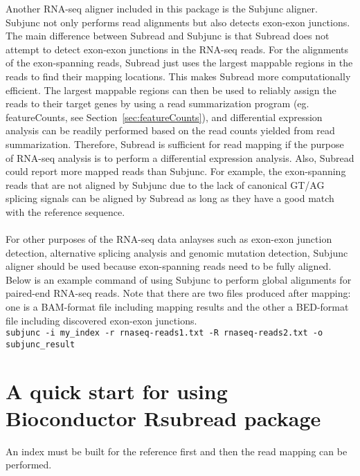 \documentclass[12pt]{report}
\newcommand{\code}[1]{{\small\texttt{#1}}}
\newcommand{\Subread}{\textsf{Subread}}
\newcommand{\Subjunc}{\textsf{Subjunc}}
\newcommand{\Rsubread}{\textsf{Rsubread}}
\newcommand{\featureCounts}{\textsf{featureCounts}}
\begin{document}
\noindent Another RNA-seq aligner included in this package is the {\Subjunc} aligner.
{\Subjunc} not only performs read alignments but also detects exon-exon junctions.
The main difference between {\Subread} and {\Subjunc} is that {\Subread} does not attempt to detect exon-exon junctions in the RNA-seq reads.
For the alignments of the exon-spanning reads, {\Subread} just uses the largest mappable regions in the reads to find their mapping locations.
This makes {\Subread} more computationally efficient.
The largest mappable regions can then be used to reliably assign the reads to their target genes by using a read summarization program (eg. \featureCounts, see Section~\ref{sec:featureCounts}), and differential expression analysis can be readily performed based on the read counts yielded from read summarization.
Therefore, {\Subread} is sufficient for read mapping if the purpose of RNA-seq analysis is to perform a differential expression analysis. 
Also, {\Subread} could report more mapped reads than {\Subjunc}.
For example, the exon-spanning reads that are not aligned by {\Subjunc} due to the lack of canonical GT/AG splicing signals can be aligned by {\Subread} as long as they have a good match with the reference sequence.\\

\noindent{{\Subjunc}}\\

For other purposes of the RNA-seq data anlayses such as exon-exon junction detection, alternative splicing analysis and genomic mutation detection, {\Subjunc} aligner should be used because exon-spanning reads need to be fully aligned.
Below is an example command of using {\Subjunc} to perform global alignments for paired-end RNA-seq reads.
Note that there are two files produced after mapping: one is a BAM-format file including mapping results and the other a BED-format file including discovered exon-exon junctions.\\

\code{subjunc -i my\_index -r rnaseq-reads1.txt -R rnaseq-reads2.txt -o subjunc\_result}

\section{A quick start for using Bioconductor {\Rsubread} package}

An index must be built for the reference first and then the read mapping can be performed.\\
\end{document}
